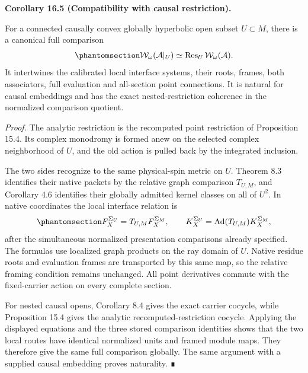 \documentclass[
  english,
  11pt,
  reqno]{amsart}
\makeatletter
\newcommand{\pandocstatementheading}[1]{%
  \par\if@nobreak\else
    \addpenalty{\@beginparpenalty}%
    \addvspace{.5\baselineskip plus .2\baselineskip minus .2\baselineskip}%
  \fi
  {\normalfont\bfseries #1\par}%
  \nobreak\@afterindenttrue\@afterheading
}
\makeatother
\begin{document}
\pandocstatementheading{\protect{}\label{cor:analytic-wave-causal-restriction}Corollary 16.5 (Compatibility with causal restriction).}

For a connected causally convex globally hyperbolic open subset
\(U\subset M\), there is a canonical full comparison
\begin{equation}\protect\phantomsection\label{eq:analytic-wave-causal-restriction}{
\mathcal W_\omega(\mathcal A|_U)
\simeq
\operatorname{Res}_U\mathcal W_\omega(\mathcal A).
}\end{equation} It intertwines the calibrated local interface systems,
their roots, frames, both associators, full evaluation and all-section
point connections. It is natural for causal embeddings and has the exact
nested-restriction coherence in the normalized comparison quotient.

\emph{Proof.} The analytic restriction is the recomputed point
restriction of Proposition 15.4. Its complex monodromy is formed anew on
the selected complex neighborhood of \(U\), and the old action is pulled
back by the integrated inclusion.

The two sides recognize to the same physical-spin metric on \(U\).
Theorem 8.3 identifies their native packets by the relative graph
comparison \(T_{U,M}\), and Corollary 4.6 identifies their globally
admitted kernel classes on all of \(U^2\). In native coordinates the
local interface relation is
\begin{equation}\protect\phantomsection\label{eq:analytic-interface-relative-carrier}{
F_X^{\Sigma_U}
=T_{U,M}F_X^{\Sigma_M},
\qquad
K_X^{\Sigma_U}
=\operatorname{Ad}(T_{U,M})K_X^{\Sigma_M},
}\end{equation} after the simultaneous normalized presentation
comparisons already specified. The formulas use localized graph products
on the ray domain of \(U\). Native residue roots and evaluation frames
are transported by this same map, so the relative framing condition
remains unchanged. All point derivatives commute with the fixed-carrier
action on every complete section.

For nested causal opens, Corollary 8.4 gives the exact carrier cocycle,
while Proposition 15.4 gives the analytic recomputed-restriction
cocycle. Applying the displayed equations and the three stored
comparison identities shows that the two local routes have identical
normalized units and framed module maps. They therefore give the same
full comparison globally. The same argument with a supplied causal
embedding proves naturality. ∎
\end{document}
